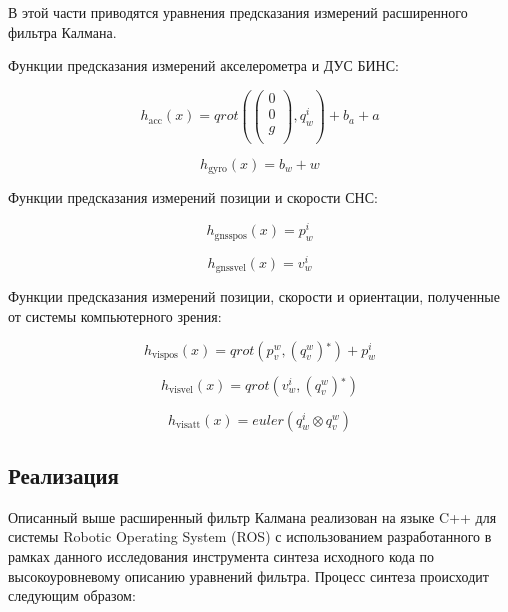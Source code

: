 \documentclass[12pt,a4paper]{article}
\begin{document}
В этой части приводятся уравнения предсказания измерений расширенного фильтра Калмана.

Функции предсказания измерений акселерометра и ДУС БИНС:

\begin{equation}
    h_{\text{acc}}(x)=qrot\left(\left(
    \begin{array}{c}
    0 \\
    0 \\
    g \\
    \end{array}
    \right),q_w^i\right)+b_a+a
\end{equation}

\begin{equation}
    h_{\text{gyro}}(x)=b_w+w
\end{equation}

Функции предсказания измерений позиции и скорости СНС:

\begin{equation}
    h_{\text{gnsspos}}(x)=p_w^i
\end{equation}

\begin{equation}
    h_{\text{gnssvel}}(x)=v_w^i
\end{equation}

Функции предсказания измерений позиции, скорости и ориентации, полученные от системы компьютерного зрения:

\begin{equation}
    h_{\text{vispos}}(x)=qrot\left(p_v^w,\left(q_v^w\right){}^*\right)+p_w^i
\end{equation}

\begin{equation}
    h_{\text{visvel}}(x)=qrot\left(v_w^i,\left(q_v^w\right){}^*\right)
\end{equation}

\begin{equation}
    h_{\text{visatt}}(x)=euler\left(q_w^i\otimes q_v^w\right)
\end{equation}

\subsection{Реализация}

Описанный выше расширенный фильтр Калмана реализован на языке C++ для системы Robotic Operating System (ROS) \cite{ROS} с использованием разработанного в рамках данного исследования инструмента синтеза исходного кода по высокоуровневому описанию уравнений фильтра. Процесс синтеза происходит следующим образом:
\end{document}
